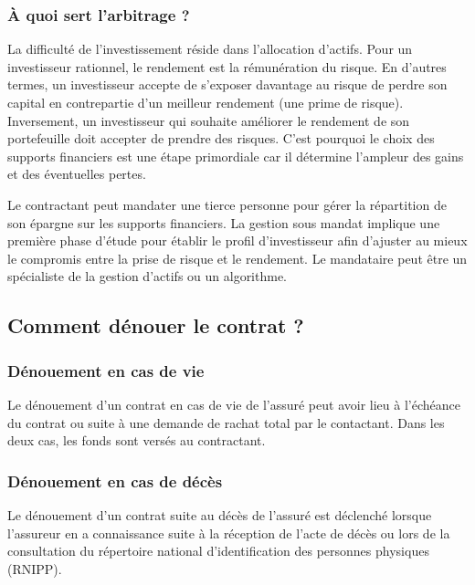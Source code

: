\documentclass{article}
\newcommand{\blackFrame}[2]{
    \begin{tcolorbox}[colback=white,colframe=black!100!white,title={#1}]
        #2
    \end{tcolorbox}
}
\begin{document}
\subsubsection{À quoi sert l'arbitrage ?}
La difficulté de l'investissement réside dans l'allocation d'actifs. Pour un investisseur rationnel, le rendement est la rémunération du risque. En d'autres termes, un investisseur accepte de s'exposer davantage au risque de perdre son capital en contrepartie d'un meilleur rendement (une prime de risque). Inversement, un investisseur qui souhaite améliorer le rendement de son portefeuille doit accepter de prendre des risques. C'est pourquoi le choix des supports financiers est une étape primordiale car il détermine l'ampleur des gains et des éventuelles pertes. 

\blackFrame{Mandat de gestion}{
Le contractant peut mandater une tierce personne pour gérer la répartition de son épargne sur les supports financiers. La gestion sous mandat implique une première phase d'étude pour établir le profil d'investisseur afin d'ajuster au mieux le compromis entre la prise de risque et le rendement. Le mandataire peut être un spécialiste de la gestion d'actifs ou un algorithme.
}

\subsection{Comment dénouer le contrat ?}
\subsubsection{Dénouement en cas de vie}
Le dénouement d'un contrat en cas de vie de l'assuré peut avoir lieu à l'échéance du contrat ou suite à une demande de rachat total par le contactant. Dans les deux cas, les fonds sont versés au contractant.

\subsubsection{Dénouement en cas de décès}
Le dénouement d'un contrat suite au décès de l'assuré est déclenché lorsque l'assureur en a connaissance suite à la réception de l'acte de décès ou lors de la consultation du répertoire national d'identification des personnes physiques (RNIPP).

\end{document}
